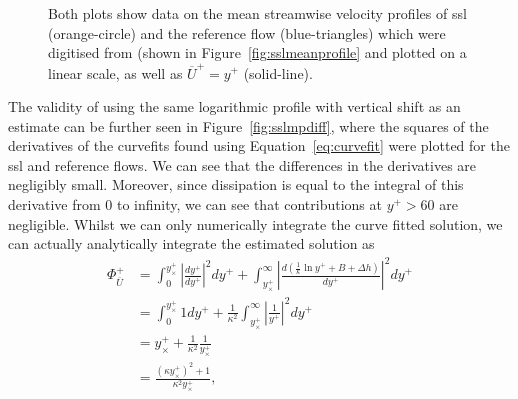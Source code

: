 \begin{figure}[htbp]
	\centering
		\caption[Mean streamwise velocity profiles of SSL and reference flows, and analytical approximations thereof]{Both plots show data on the mean streamwise velocity profiles of \gls{ssl} (orange-circle) and the reference flow (blue-triangles) which were digitised from \textcite{viotti2009} (shown in Figure~\ref{fig:sslmeanprofile} and plotted on a linear scale, as well as $\overline{U}^+=y^+$ (solid-line). }
	\label{fig:sslmplin}
\end{figure}
The validity of using the same logarithmic profile with vertical shift as an estimate can be further seen in Figure~\ref{fig:sslmpdiff}, where the squares of the derivatives of the curvefits found using Equation~\eqref{eq:curvefit} were plotted for the \gls{ssl} and reference flows. We can see that the differences in the derivatives are negligibly small. Moreover, since dissipation is equal to the integral of this derivative from 0 to infinity, we can see that contributions at $y^{+}>60$ are negligible. Whilst we can only numerically integrate the curve fitted solution, we can actually analytically integrate the estimated solution as
\begin{align}
	\Phi _{\overline{U}}^{+} &= \int_{0}^{y_{\times}^{+}} \left| \frac{dy^{+}}{dy^{+}} \right|^2dy^{+} + \int_{y_{\times}^{+}}^{\infty} \left| \frac{d\left( \frac{1}{\kappa}\ln y^{+} +B+\Delta h\right) }{dy^{+}} \right|^2dy^{+}  \\
	&= \int_{0}^{y_{\times}^{+}} 1dy^{+} + \frac{1}{\kappa^2}\int_{y_{\times}^{+}}^{\infty} \left| \frac{1}{y^{+}} \right|^2dy^{+}  \\
	&= y_{\times}^{+} + \frac{1}{\kappa^2}\frac{1}{y_{\times}^{+}}\\
	&=\frac{\left(  \kappa y_{\times}^{+}  \right) ^2+ 1}{\kappa^2 y_{\times}^{+}}\label{eq:fiycross}
,\end{align}
